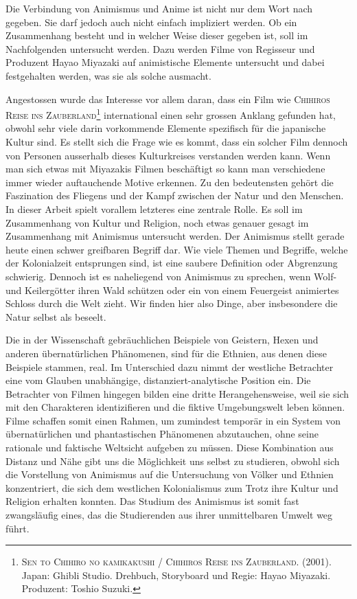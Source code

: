 
Die Verbindung von Animismus und Anime ist nicht nur dem Wort nach gegeben. Sie darf jedoch auch nicht einfach impliziert werden. Ob ein Zusammenhang besteht und in welcher Weise dieser gegeben ist, soll im Nachfolgenden untersucht werden. Dazu werden Filme von Regisseur und Produzent Hayao Miyazaki auf animistische Elemente untersucht und dabei festgehalten werden, was sie als solche ausmacht.

Angestossen wurde das Interesse vor allem daran, dass ein Film wie \textsc{Chihiros Reise ins Zauberland}\footnote{\textsc{Sen to Chihiro no kamikakushi / Chihiros Reise ins Zauberland}. (2001). Japan: Ghibli Studio. Drehbuch, Storyboard und Regie: Hayao Miyazaki. Produzent: Toshio Suzuki.} international einen sehr grossen Anklang gefunden hat, obwohl sehr viele darin vorkommende Elemente spezifisch für die japanische Kultur sind. Es stellt sich die Frage wie es kommt, dass ein solcher Film dennoch von Personen ausserhalb dieses Kulturkreises verstanden werden kann. Wenn man sich etwas mit Miyazakis Filmen beschäftigt so kann man verschiedene immer wieder auftauchende Motive erkennen. Zu den bedeutensten gehört die Faszination des Fliegens und der Kampf zwischen der Natur und den Menschen. In dieser Arbeit spielt vorallem letzteres eine zentrale Rolle. Es soll im Zusammenhang von Kultur und Religion, noch etwas genauer gesagt im Zusammenhang mit Animismus untersucht werden. Der Animismus stellt gerade heute einen schwer greifbaren Begriff dar. Wie viele Themen und Begriffe, welche der Kolonialzeit entsprungen sind, ist eine saubere Definition oder Abgrenzung schwierig. Dennoch ist es naheliegend von Animismus zu sprechen, wenn Wolf- und Keilergötter ihren Wald schützen oder ein von einem Feuergeist animiertes Schloss durch die Welt zieht. Wir finden hier also Dinge, aber insbesondere die Natur selbst als beseelt. 

Die in der Wissenschaft gebräuchlichen Beispiele von Geistern, Hexen und anderen übernatürlichen Phänomenen, sind für die Ethnien, aus denen diese Beispiele stammen, real. Im Unterschied dazu nimmt der westliche Betrachter eine vom Glauben unabhängige, distanziert-analytische Position ein. Die Betrachter von Filmen hingegen bilden eine dritte Herangehensweise, weil sie sich mit den Charakteren identizifieren und die fiktive Umgebungswelt leben können. Filme schaffen somit einen Rahmen, um zumindest temporär in ein System von übernatürlichen und phantastischen Phänomenen abzutauchen, ohne seine rationale und faktische Weltsicht aufgeben zu müssen. Diese Kombination aus Distanz und Nähe gibt uns die Möglichkeit uns selbst zu studieren, obwohl sich die Vorstellung von Animismus auf die Untersuchung von Völker und Ethnien konzentriert, die sich dem westlichen Kolonialismus zum Trotz ihre Kultur und Religion erhalten konnten. Das Studium des Animismus ist somit fast zwangsläufig eines, das die Studierenden aus ihrer unmittelbaren Umwelt weg führt. 

